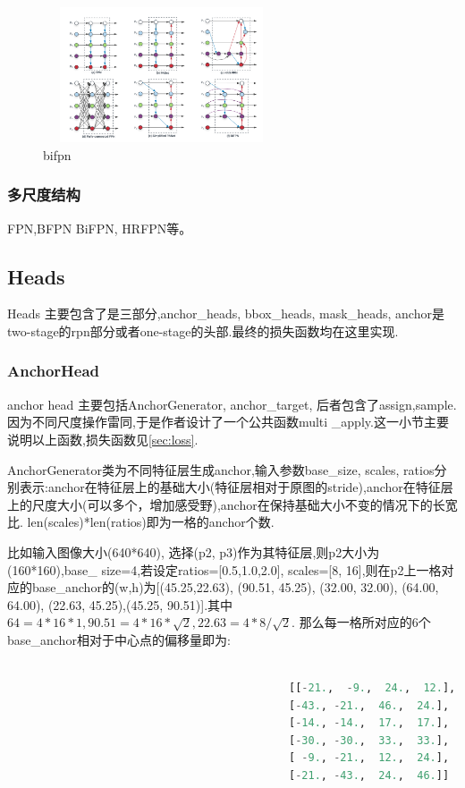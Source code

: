 \documentclass[UTF8]{ctexart}
\begin{document}
\begin{figure}[htbp]
	\centering
	\includegraphics[width=7cm,height=4cm]{./pic/BiFPN.png}
	\caption{bifpn}
	\label{picbifpn}
\end{figure}


\subsubsection{多尺度结构}
FPN,BFPN BiFPN, HRFPN等。

\subsection{Heads}
Heads 主要包含了是三部分,anchor\_heads, bbox\_heads, mask\_heads,
anchor是two-stage的rpn部分或者one-stage的头部.最终的损失函数均在这里实现.

\subsubsection{AnchorHead}
\label{sub:anchorhead}
anchor head 主要包括AnchorGenerator, anchor\_target, 后者包含了assign,sample.因为不同尺度操作雷同,于是作者设计了一个公共函数multi
\_apply.这一小节主要说明以上函数,损失函数见\ref{sec:loss}.

AnchorGenerator类为不同特征层生成anchor,输入参数base\_size, scales, ratios分别表示:anchor在特征层上的基础大小(特征层相对于原图的stride),anchor在特征层上的尺度大小(可以多个，增加感受野),anchor在保持基础大小不变的情况下的长宽比.
len(scales)*len(ratios)即为一格的anchor个数.

比如输入图像大小(640*640), 选择(p2, p3)作为其特征层,则p2大小为(160*160),base\_ size=4,若设定ratios=[0.5,1.0,2.0], scales=[8, 16],则在p2上一格对应的base\_anchor的(w,h)为[(45.25,22.63),  (90.51, 45.25),
 (32.00, 32.00),  (64.00, 64.00), (22.63, 45.25),(45.25, 90.51)].其中$64=4*16*1,90.51=4*16*\sqrt{2}, 22.63=4*8/\sqrt{2}.$
 那么每一格所对应的6个base\_anchor相对于中心点的偏移量即为:
\lstset{style=mystyle}
\begin{lstlisting}[language=Python]
	
											[[-21.,  -9.,  24.,  12.],
											[-43., -21.,  46.,  24.],
											[-14., -14.,  17.,  17.],
											[-30., -30.,  33.,  33.],
											[ -9., -21.,  12.,  24.],
											[-21., -43.,  24.,  46.]]

\end{lstlisting}
\end{document}

